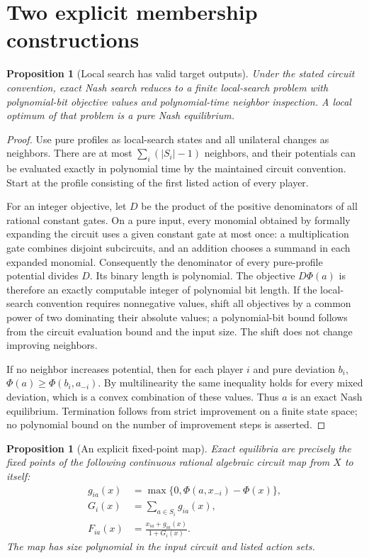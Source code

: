 \documentclass[11pt]{article}
\newtheorem{proposition}[theorem]{Proposition}
\theoremstyle{definition}
\begin{document}
\section{Two explicit membership constructions}
\begin{proposition}[Local search has valid target outputs]\label{pls}
Under the stated circuit convention, exact Nash search reduces to a finite
local-search problem with polynomial-bit objective values and polynomial-time
neighbor inspection. A local optimum of that problem is a pure Nash equilibrium.
\end{proposition}
\begin{proof}
Use pure profiles as local-search states and all unilateral changes as
neighbors. There are at most $\sum_i(|S_i|-1)$ neighbors, and their
potentials can be evaluated exactly in polynomial time by the maintained
circuit convention. Start at the profile consisting of the first listed
action of every player.

For an integer objective, let $D$ be the product of the positive denominators
of all rational constant gates. On a pure input, every monomial obtained by
formally expanding the circuit uses a given constant gate at most once:
a multiplication gate combines disjoint subcircuits, and an addition chooses
a summand in each expanded monomial. Consequently the denominator of every
pure-profile potential divides $D$. Its binary length is polynomial.
The objective $D\Phi(a)$ is therefore an exactly computable integer of
polynomial bit length. If the local-search convention requires nonnegative
values, shift all objectives by a common power of two dominating their
absolute values; a polynomial-bit bound follows from the circuit evaluation
bound and the input size. The shift does not change improving neighbors.

If no neighbor increases potential, then for each player $i$ and pure
deviation $b_i$, $\Phi(a)\ge\Phi(b_i,a_{-i})$. By multilinearity the
same inequality holds for every mixed deviation, which is a convex
combination of these values. Thus $a$ is an exact Nash equilibrium.
Termination follows from strict improvement on a finite state space; no
polynomial bound on the number of improvement steps is asserted.
\end{proof}
\begin{proposition}[An explicit fixed-point map]\label{fixp}
Exact equilibria are precisely the fixed points of the following continuous
rational algebraic circuit map from $X$ to itself:
\begin{align*}
 g_{ia}(x)&=\max\{0,\Phi(a,x_{-i})-\Phi(x)\},\\
 G_i(x)&=\sum_{a\in S_i}g_{ia}(x),\\
 F_{ia}(x)&=\frac{x_{ia}+g_{ia}(x)}{1+G_i(x)}.
\end{align*}
The map has size polynomial in the input circuit and listed action sets.
\end{proposition}
\end{document}

